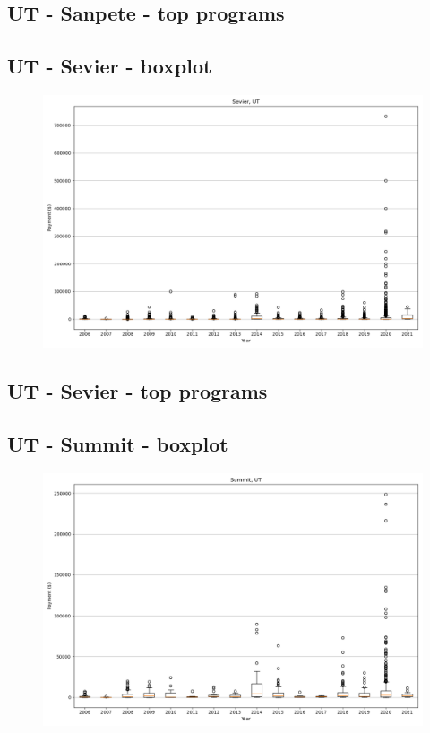\subsection*{UT - Sanpete - top programs}

\newpage
\subsection*{UT - Sevier - boxplot}
\begin{figure}[h]
\centering
\includegraphics[width=7in]{../output/boxplots/counties/Sevier-UT_boxplot.png}
\end{figure}


\subsection*{UT - Sevier - top programs}

\newpage
\subsection*{UT - Summit - boxplot}
\begin{figure}[h]
\centering
\includegraphics[width=7in]{../output/boxplots/counties/Summit-UT_boxplot.png}
\end{figure}


